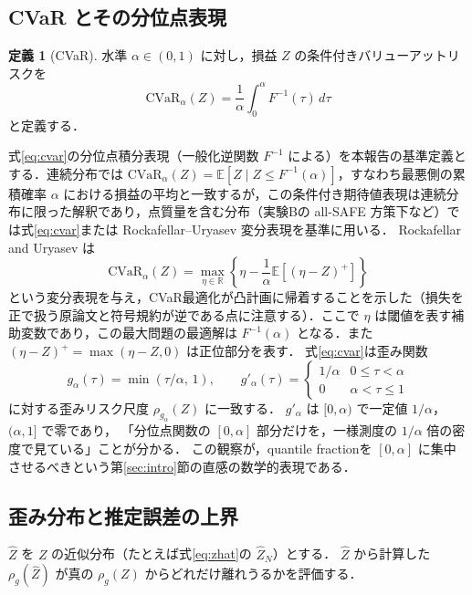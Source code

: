 \documentclass[a4paper,10pt]{jsarticle}
\theoremstyle{definition}
\newtheorem{definition}{定義}[section]
\newcommand{\CVaR}{\mathrm{CVaR}}
\newcommand{\Finv}{F^{-1}}
\newcommand{\R}{\mathbb{R}}
\newcommand{\E}{\mathbb{E}}
\begin{document}
\subsection{CVaR とその分位点表現}
\label{subsec:cvar}
\begin{definition}[CVaR]
水準 $\alpha\in(0,1)$ に対し，損益 $Z$ の条件付きバリューアットリスクを
\begin{equation}
  \CVaR_\alpha(Z)=\frac1\alpha\int_0^\alpha\Finv(\tau)\,d\tau
  \label{eq:cvar}
\end{equation}
と定義する．
\end{definition}
式\eqref{eq:cvar}の分位点積分表現（一般化逆関数 $\Finv$ による）を本報告の基準定義とする．連続分布では $\CVaR_\alpha(Z)=\E[Z\mid Z\le\Finv(\alpha)]$，すなわち最悪側の累積確率 $\alpha$ における損益の平均と一致するが，この条件付き期待値表現は連続分布に限った解釈であり，点質量を含む分布（実験Bの all-SAFE 方策下など）では式\eqref{eq:cvar}または Rockafellar--Uryasev 変分表現を基準に用いる．
Rockafellar and Uryasev \cite{rockafellar2000cvar} は
\begin{equation}
  \CVaR_\alpha(Z)=\max_{\eta\in\R}\left\{\eta-\frac1\alpha\E\left[(\eta-Z)^+\right]\right\}
\end{equation}
という変分表現を与え，CVaR最適化が凸計画に帰着することを示した（損失を正で扱う原論文と符号規約が逆である点に注意する）．ここで $\eta$ は閾値を表す補助変数であり，この最大問題の最適解は $\Finv(\alpha)$ となる．また $(\eta-Z)^+=\max(\eta-Z,0)$ は正位部分を表す．
式\eqref{eq:cvar}は歪み関数
\begin{equation}
  g_\alpha(\tau)=\min\left(\tau/\alpha,\,1\right),\qquad
  g'_\alpha(\tau)=\begin{cases}1/\alpha & 0\le\tau<\alpha\\ 0 & \alpha<\tau\le 1\end{cases}
  \label{eq:g-cvar}
\end{equation}
に対する歪みリスク尺度 $\rho_{g_\alpha}(Z)$ に一致する．
$g'_\alpha$ は $[0,\alpha)$ で一定値 $1/\alpha$，$(\alpha,1]$ で零であり，
「分位点関数の $[0,\alpha]$ 部分だけを，一様測度の $1/\alpha$ 倍の密度で見ている」ことが分かる．
この観察が，quantile fractionを $[0,\alpha]$ に集中させるべきという第\ref{sec:intro}節の直感の数学的表現である．

\subsection{歪み分布と推定誤差の上界}
\label{subsec:bound}
$\hat Z$ を $Z$ の近似分布（たとえば式\eqref{eq:zhat}の $\hat Z_N$）とする．
$\hat Z$ から計算した $\rho_g(\hat Z)$ が真の $\rho_g(Z)$ からどれだけ離れうるかを評価する．
\end{document}
